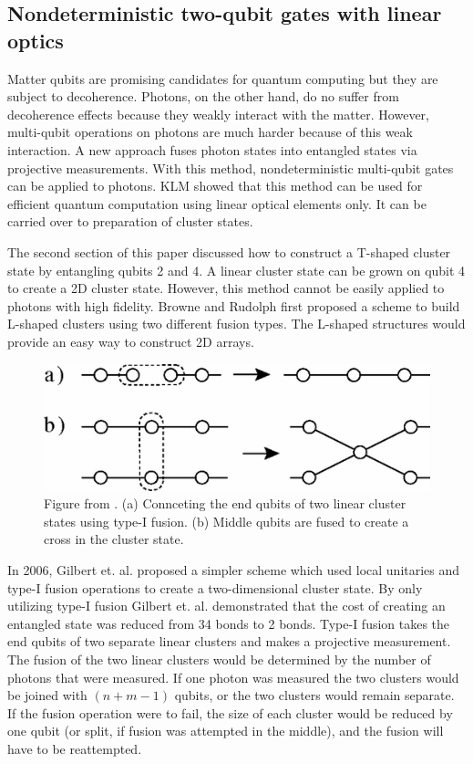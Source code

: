 \documentclass[twocolumn]{Styles/IEEEtran11}
\begin{document}
\subsection{Nondeterministic two-qubit gates with linear optics}

Matter qubits are promising candidates for quantum computing but they are subject to decoherence. Photons, on the other hand, do no suffer from decoherence effects because they weakly interact with the matter. However, multi-qubit operations on photons are much harder because of this weak interaction. A new approach fuses photon states into entangled states via projective measurements. With this method, nondeterministic multi-qubit gates can be applied to photons. KLM \cite{klm2000} showed that this method can be used for efficient quantum computation using linear optical elements only. It can be carried over to preparation of cluster states. 

The second section of this paper discussed how to construct a T-shaped cluster state by entangling qubits 2 and 4. A linear cluster state can be grown on qubit 4 to create a 2D cluster state.  However, this method cannot be easily applied to photons with high fidelity. Browne and Rudolph \cite{browne2005efficient} first proposed a scheme to build L-shaped clusters using two different fusion types. The L-shaped structures would provide an easy way to construct 2D arrays. 
  \begin{figure}[t]
   \centering
    \includegraphics[width=\linewidth]{Images/fusiontypes.png}
    \caption{Figure from \protect\cite{browne2005efficient}. (a) Connceting the end qubits of two linear cluster states using type-I fusion. (b) Middle qubits are fused to create a cross in the cluster state.}
  \end{figure}
In 2006, Gilbert et. al. \cite{gerald2006efficient} proposed a simpler scheme which used local unitaries and type-I fusion operations to create a two-dimensional cluster state.  By only utilizing type-I fusion Gilbert et. al. demonstrated that the cost of creating an entangled state was reduced from 34 bonds to 2 bonds. Type-I fusion takes the end qubits of two separate linear clusters and makes a projective measurement. The fusion of the two linear clusters would be determined by the number of photons that were measured. If one photon was measured the two clusters would be joined with $(n+m-1)$ qubits, or the two clusters would remain separate. If the fusion operation were to fail, the size of each cluster would be reduced by one qubit (or split, if fusion was attempted in the middle), and the fusion will have to be reattempted.
\end{document}
